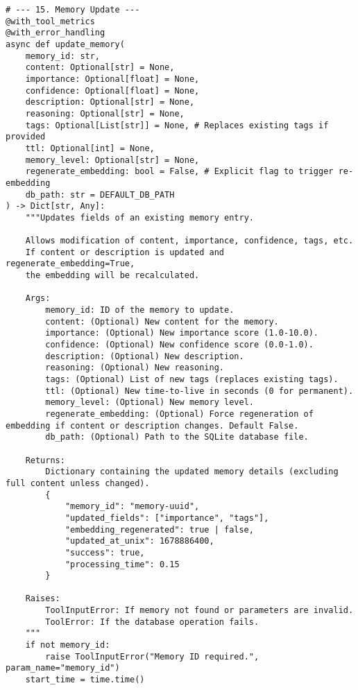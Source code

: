 \documentclass[12pt,a4paper]{article}
\begin{document}
\begin{pageablecode}
\begin{verbatim}
# --- 15. Memory Update ---
@with_tool_metrics
@with_error_handling
async def update_memory(
    memory_id: str,
    content: Optional[str] = None,
    importance: Optional[float] = None,
    confidence: Optional[float] = None,
    description: Optional[str] = None,
    reasoning: Optional[str] = None,
    tags: Optional[List[str]] = None, # Replaces existing tags if provided
    ttl: Optional[int] = None,
    memory_level: Optional[str] = None,
    regenerate_embedding: bool = False, # Explicit flag to trigger re-embedding
    db_path: str = DEFAULT_DB_PATH
) -> Dict[str, Any]:
    """Updates fields of an existing memory entry.

    Allows modification of content, importance, confidence, tags, etc.
    If content or description is updated and regenerate_embedding=True,
    the embedding will be recalculated.

    Args:
        memory_id: ID of the memory to update.
        content: (Optional) New content for the memory.
        importance: (Optional) New importance score (1.0-10.0).
        confidence: (Optional) New confidence score (0.0-1.0).
        description: (Optional) New description.
        reasoning: (Optional) New reasoning.
        tags: (Optional) List of new tags (replaces existing tags).
        ttl: (Optional) New time-to-live in seconds (0 for permanent).
        memory_level: (Optional) New memory level.
        regenerate_embedding: (Optional) Force regeneration of embedding if content or description changes. Default False.
        db_path: (Optional) Path to the SQLite database file.

    Returns:
        Dictionary containing the updated memory details (excluding full content unless changed).
        {
            "memory_id": "memory-uuid",
            "updated_fields": ["importance", "tags"],
            "embedding_regenerated": true | false,
            "updated_at_unix": 1678886400,
            "success": true,
            "processing_time": 0.15
        }

    Raises:
        ToolInputError: If memory not found or parameters are invalid.
        ToolError: If the database operation fails.
    """
    if not memory_id: 
        raise ToolInputError("Memory ID required.", param_name="memory_id")
    start_time = time.time()


\end{verbatim}
\end{pageablecode}
\end{document}
